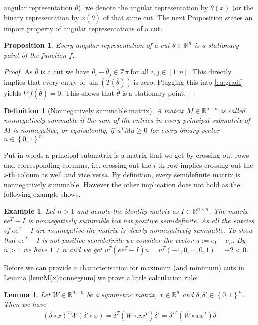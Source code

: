 \documentclass[12pt,a4paper]{article}
\theoremstyle{mythm}
\newtheorem{Def}[thm]{Definition}
\newtheorem{prop}[thm]{Proposition}
\newtheorem{lem}[thm]{Lemma}
\newtheorem*{exa}{Example}
\begin{document}
angular representation $ \overline{ \theta }  $), we denote the angular representation by $ \theta ( \overline{ x } ) $ 
(or the binary representation by $ x ( \overline{ \theta } ) $ of that same cut.
The next Proposition states an import property of angular representations of a cut.
\begin{prop}
\label{prop:cutsArestationaryPoints} 
Every angular representation of a cut $ \overline{ \theta } \in \mathbb{R} ^{ n }  $ is a stationary point of the function $ f $.
\end{prop} 
\begin{proof}
As $ \overline{ \theta } $ is a cut we have $ \overline{ \theta } _{ i } - \overline{ \theta } _{ j } \in \mathbb{Z} \pi  $ for all $ i,j \in \left[ 1:n \right]  $. 
This directly implies that every entry of $ \sin( T ( \overline{ \theta } ) )  $ is zero. Plugging this into \ref{eq:gradf} yields $ \nabla f ( \overline{ \theta } ) = 0$.
This shows that $ \overline{ \theta }  $ is a stationary point.
\end{proof}
\begin{Def}[Nonnegatively summable matrix]
A matrix $ M \in \mathbb{R} ^{ n \times n }  $ is called nonnegatively summable if the sum of the entries in every principal submatrix of $ M $ is nonnegative, or
equivalently, if $ u ^{ T} M u \geq 0    $ for every binary vector $ u \in \left\{ 0,1 \right\} ^{ n }  $ 
\end{Def} 
Put in words a principal submatrix is a matrix that we get by crossing out rows and corresponding columns, i.e. crossing out the $ i$-th row implies crossing out the $ i
$-th coloum as well and vice versa.
By definition, every semidefinite matrix is nonnegatively summable. However the other implication does not hold as the following example shows.
\begin{exa}
Let $ n>1 $ and denote the identity matrix as $ I \in \mathbb{R} ^{ n \times n }  $.
The matrix $ ee^T - I $ is nonnegatively summable but not positive semidefinite.
As all the entries of $ ee^T - I $ are nonnegative the matrix is clearly nonnegatively summable.
To show that $ ee^T - I $ is not positive semidefinite we consider the vector $ u := e_1 - e_n $. By $ n>1  $ we have $ 1 \neq n  $ and we get 
$ u ^T \left( ee^T - I \right) u = u^T \left( -1,0, \cdots, 0,1 \right) = -2 < 0  $.
\end{exa} 
Before we can provide a characterisation for maximum (and minimum) cuts in Lemma \ref{lem:M(x)nonnegsum} we prove a little calculation rule:
\begin{lem}
\label{lem:calcrule} 
Let $ W \in \mathbb{R} ^{ n \times n }  $ be a symmetric matrix, $ x \in \mathbb{R} ^{ n } $ and $ \delta,  \delta ' \in \left\{ 0,1 \right\} ^{ n }  $.
Then we have
\begin{align*}
\left( \delta \circ x \right) ^T W \left(  \delta '  \circ x \right) = \delta ^T \left( W \circ x x ^T  \right)  \delta ' =  \delta '^T \left( W \circ x x ^T  \right) \delta
\end{align*} 
\end{lem} 
\end{document}
